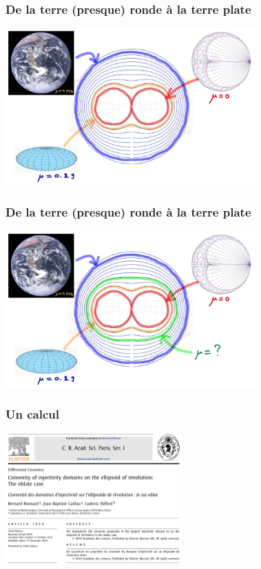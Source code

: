 \documentclass[9pt]{beamer}
\begin{document}
\begin{frame}
\frametitle{\bf De la terre (presque) ronde à la terre plate}
 
\centering \includegraphics[height=6.0cm]{oblat3}

\end{frame}

\begin{frame}
\frametitle{\bf De la terre (presque) ronde à la terre plate}
 
\centering \includegraphics[height=6.0cm]{oblat4}

\end{frame}

\begin{frame}
\frametitle{\bf Un calcul}
 
\centering \includegraphics[height=5.0cm]{cras1}

\end{frame}
\end{document}
